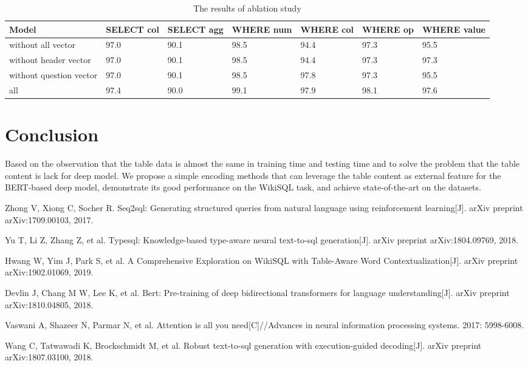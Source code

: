 \documentclass{llncs}
\begin{document}
\begin{table}
\caption{The results of ablation study}\label{tab1}
\centering
\begin{tabular}{|l|l|l|l|l|l|l|}
\hline
Model & SELECT col & SELECT agg & WHERE num & WHERE col & WHERE op & WHERE value\\
\hline
without all vector & 97.0 & 90.1 & 98.5 & 94.4& 97.3 & 95.5 \\ 
\hline
without header vector & 97.0 & 90.1 & 98.5 & 94.4 & 97.3 &97.3\\
\hline
without question vector & 97.0 & 90.1 & 98.5 & 97.8 & 97.3 &95.5\\
\hline
all  & 97.4 & 90.0 & 99.1 & 97.9 & 98.1 &97.6\\
\hline
\end{tabular}
\end{table}


\section{Conclusion}

Based on the observation that the table data is almost the same in training time and testing time and to solve the problem that the table content is lack for deep model. We propose a simple encoding methods that can leverage the table content as external feature for the BERT-based deep model, demonstrate its good performance on the WikiSQL task, and achieve state-of-the-art on the datasets. 


\begin{thebibliography}{8}

Zhong V, Xiong C, Socher R. Seq2sql: Generating structured queries from natural language using reinforcement learning[J]. arXiv preprint arXiv:1709.00103, 2017.

Yu T, Li Z, Zhang Z, et al. Typesql: Knowledge-based type-aware neural text-to-sql generation[J]. arXiv preprint arXiv:1804.09769, 2018.

Hwang W, Yim J, Park S, et al. A Comprehensive Exploration on WikiSQL with Table-Aware Word Contextualization[J]. arXiv preprint arXiv:1902.01069, 2019.

Devlin J, Chang M W, Lee K, et al. Bert: Pre-training of deep bidirectional transformers for language understanding[J]. arXiv preprint arXiv:1810.04805, 2018.

Vaswani A, Shazeer N, Parmar N, et al. Attention is all you need[C]//Advances in neural information processing systems. 2017: 5998-6008.

Wang C, Tatwawadi K, Brockschmidt M, et al. Robust text-to-sql generation with execution-guided decoding[J]. arXiv preprint arXiv:1807.03100, 2018.

\end{thebibliography}
\end{document}
